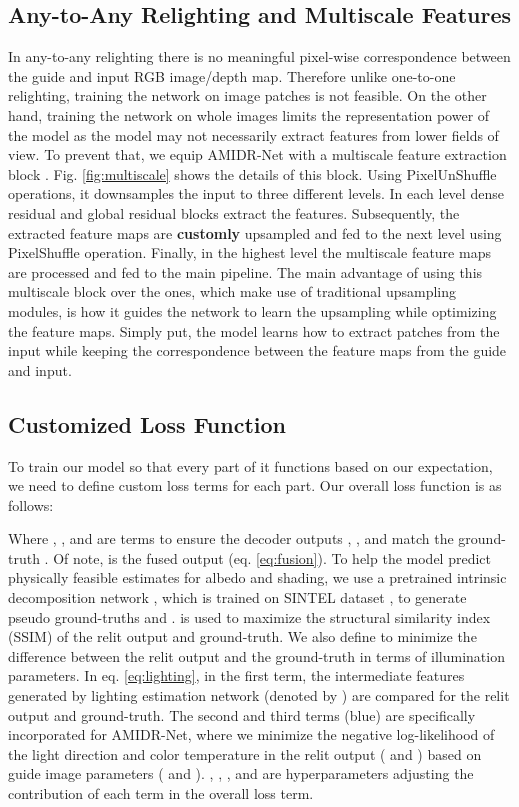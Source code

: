 \documentclass[final]{cvpr}
\newcommand{\squeezeup}{\vspace{-5mm}}
\newcommand{\smallsqueezeup}{\vspace{-2mm}}
\begin{document}
\subsection{Any-to-Any Relighting and Multiscale Features}
In any-to-any relighting there is no meaningful pixel-wise correspondence between the guide and input RGB image/depth map. Therefore unlike one-to-one relighting, training the network on image patches is not feasible. On the other hand, training the network on whole images limits the representation power of the model as the model may not necessarily extract features from lower fields of view. To prevent that, we equip AMIDR-Net with a multiscale feature extraction block \cite{23}. Fig. \ref{fig:multiscale} shows the details of this block. Using PixelUnShuffle operations, it downsamples the input to three different levels. In each level dense residual and global residual blocks extract the features. Subsequently, the extracted feature maps are \textbf{customly} upsampled and fed to the next level using PixelShuffle operation. Finally, in the highest level the multiscale feature maps are processed and fed to the main pipeline. The main advantage of using this multiscale block over the ones, which make use of traditional upsampling modules, is how it guides the network to learn the upsampling while optimizing the feature maps. Simply put, the model learns how to extract patches from the input while keeping the correspondence between the feature maps from the guide and input.


\subsection{Customized Loss Function}
To train our model so that every part of it functions based on our expectation, we need to define custom loss terms for each part. Our overall loss function is as follows:\smallsqueezeup
\small

\squeezeup





 \normalsize
 \color{black}
 Where , , and  are terms to ensure the decoder outputs , , and  match the ground-truth . Of note,  is the fused output (eq. \ref{eq:fusion}). To help the model predict physically feasible estimates for albedo and shading, we use a pretrained intrinsic decomposition network \cite{3}, which is trained on SINTEL dataset \cite{43}, to generate pseudo ground-truths  and .  is used to maximize the structural similarity index (SSIM) of the relit output and ground-truth. We also define  to minimize the difference between the relit output and the ground-truth in terms of illumination parameters. In eq. \ref{eq:lighting}, in the first term, the intermediate features generated by lighting estimation network (denoted by ) are compared for the relit output and ground-truth. The second and third terms (blue) are specifically incorporated for AMIDR-Net, where we minimize the negative log-likelihood of the light direction and color temperature in the relit output ( and ) based on guide image parameters ( and ). , , , and  are hyperparameters adjusting the contribution of each term in the overall loss term.
\end{document}
